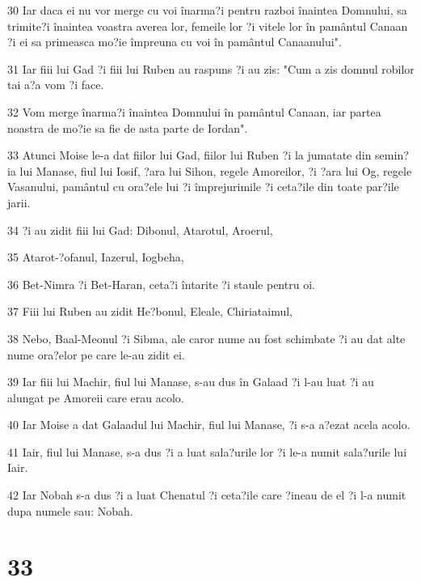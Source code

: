 \par 30 Iar daca ei nu vor merge cu voi înarma?i pentru razboi înaintea Domnului, sa trimite?i înaintea voastra averea lor, femeile lor ?i vitele lor în pamântul Canaan ?i ei sa primeasca mo?ie împreuna cu voi în pamântul Canaanului".
\par 31 Iar fiii lui Gad ?i fiii lui Ruben au raspuns ?i au zis: "Cum a zis domnul robilor tai a?a vom ?i face.
\par 32 Vom merge înarma?i înaintea Domnului în pamântul Canaan, iar partea noastra de mo?ie sa fie de asta parte de Iordan".
\par 33 Atunci Moise le-a dat fiilor lui Gad, fiilor lui Ruben ?i la jumatate din semin?ia lui Manase, fiul lui Iosif, ?ara lui Sihon, regele Amoreilor, ?i ?ara lui Og, regele Vasanului, pamântul cu ora?ele lui ?i împrejurimile ?i ceta?ile din toate par?ile jarii.
\par 34 ?i au zidit fiii lui Gad: Dibonul, Atarotul, Aroerul,
\par 35 Atarot-?ofanul, Iazerul, Iogbeha,
\par 36 Bet-Nimra ?i Bet-Haran, ceta?i întarite ?i staule pentru oi.
\par 37 Fiii lui Ruben au zidit He?bonul, Eleale, Chiriataimul,
\par 38 Nebo, Baal-Meonul ?i Sibma, ale caror nume au fost schimbate ?i au dat alte nume ora?elor pe care le-au zidit ei.
\par 39 Iar fiii lui Machir, fiul lui Manase, s-au dus în Galaad ?i l-au luat ?i au alungat pe Amoreii care erau acolo.
\par 40 Iar Moise a dat Galaadul lui Machir, fiul lui Manase, ?i s-a a?ezat acela acolo.
\par 41 Iair, fiul lui Manase, s-a dus ?i a luat sala?urile lor ?i le-a numit sala?urile lui Iair.
\par 42 Iar Nobah s-a dus ?i a luat Chenatul ?i ceta?ile care ?ineau de el ?i l-a numit dupa numele sau: Nobah.

\chapter{33}

